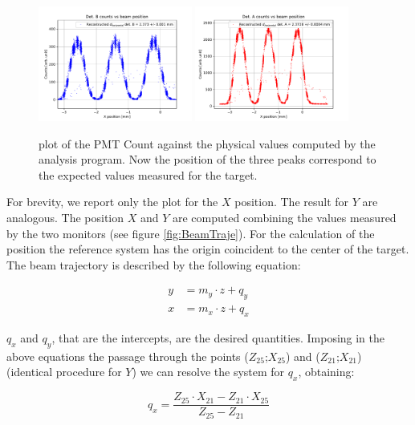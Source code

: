 \begin{figure}[hbtp]
\centering
\includegraphics[width=0.45\textwidth]{Analysis/XcheckB.pdf} 
\includegraphics[width=0.45\textwidth]{Analysis/XcheckA.pdf}
\caption{plot of the PMT Count against the physical values computed by the analysis program. Now the position of the three peaks correspond to the expected values measured for the target.}
\label{fig:CheckHori}
\end{figure}

For brevity, we report only the plot for the $X$ position. The result for $Y$ are analogous. The position $X$ and $Y$ are computed combining the values measured by the two monitors (see figure \ref{fig:BeamTraje}).
For the calculation of the position the reference system has the origin coincident to the center of the target. The beam trajectory is described by the following equation:

\begin{align*}
y &= m_{y} \cdot z + q_{y} \\
x &= m_{x} \cdot z + q_{x}
\end{align*}

$q_{x}$ and $q_{y}$, that are the intercepts, are the desired quantities.
Imposing in the above equations the passage through the points ($Z_{25}$;$X_{25}$) and ($Z_{21}$;$X_{21}$) (identical procedure for $Y$) we can resolve the system for $q_{x}$, obtaining:

\begin{equation}
q_{x} = \dfrac{Z_{25} \cdot X_{21} - Z_{21} \cdot X_{25}}{Z_{25} - Z_{21}}
\end{equation} 

